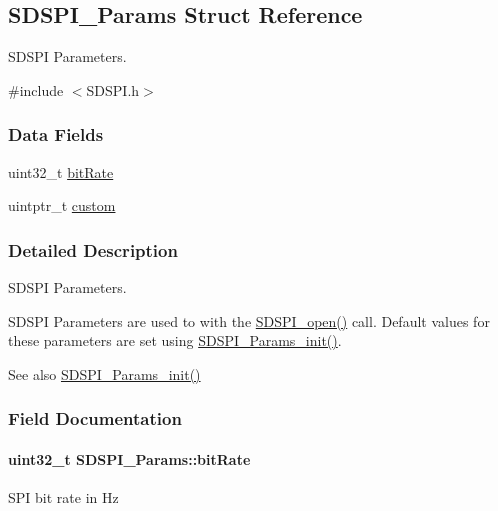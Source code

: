 \subsection{S\+D\+S\+P\+I\+\_\+\+Params Struct Reference}
\label{struct_s_d_s_p_i___params}


S\+D\+S\+P\+I Parameters.  




{\ttfamily \#include $<$S\+D\+S\+P\+I.\+h$>$}

\subsubsection*{Data Fields}
\begin{DoxyCompactItemize}
\item 
uint32\+\_\+t \hyperlink{struct_s_d_s_p_i___params_ad1885e9d1f89f0d756198454a9cefccb}{bit\+Rate}
\item 
uintptr\+\_\+t \hyperlink{struct_s_d_s_p_i___params_a6872317d366047e5d0b8eab22ca0a828}{custom}
\end{DoxyCompactItemize}


\subsubsection{Detailed Description}
S\+D\+S\+P\+I Parameters. 

S\+D\+S\+P\+I Parameters are used to with the \hyperlink{_s_d_s_p_i_8h_af4a5ca9bb35e8a7df02acf20ceeae66d}{S\+D\+S\+P\+I\+\_\+open()} call. Default values for these parameters are set using \hyperlink{_s_d_s_p_i_8h_a6fe24eaba1cca88242c5df360a074ca8}{S\+D\+S\+P\+I\+\_\+\+Params\+\_\+init()}.

\begin{DoxySeeAlso}{See also}
\hyperlink{_s_d_s_p_i_8h_a6fe24eaba1cca88242c5df360a074ca8}{S\+D\+S\+P\+I\+\_\+\+Params\+\_\+init()} 
\end{DoxySeeAlso}


\subsubsection{Field Documentation}
\paragraph[{bit\+Rate}]{\setlength{\rightskip}{0pt plus 5cm}uint32\+\_\+t S\+D\+S\+P\+I\+\_\+\+Params\+::bit\+Rate}\label{struct_s_d_s_p_i___params_ad1885e9d1f89f0d756198454a9cefccb}
S\+P\+I bit rate in Hz 
